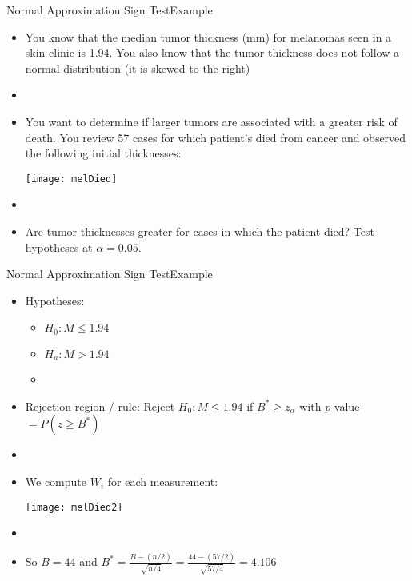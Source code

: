 \documentclass[xcolor=dvipsnames]{beamer}
\begin{document}
\begin{frame}{Normal Approximation Sign Test}{Example}
	\begin{itemize}
		\item You know that the median tumor thickness (mm) for melanomas seen in a skin clinic is 1.94. You also know that the tumor thickness does not follow a normal distribution (it is skewed to the right) \pause
		\item[]
		\item You want to determine if larger tumors are associated with a greater risk of death. You review 57 cases for which patient's died from cancer and observed the following initial thicknesses:
		\begin{center}
			\texttt{[image: melDied]}
		\end{center} \pause
	\item[]
		\item Are tumor thicknesses greater for cases in which the patient died? Test hypotheses at $\alpha = 0.05$.
	\end{itemize}
\end{frame}

\begin{frame}{Normal Approximation Sign Test}{Example}
	\begin{itemize}
		\item Hypotheses: \pause
		\begin{itemize}
			\item $H_0: M \leq 1.94$ \pause
			\item $H_a: M > 1.94$ \pause
			\item[]
		\end{itemize}
		\item Rejection region / rule: Reject $H_0: M \leq 1.94$ if $B^* \geq z_{\alpha}$ with $p$-value $=P(z \geq B^*)$ \pause
		\item[]
		\item We compute $W_i$ for each measurement: 
		\begin{center}
			\texttt{[image: melDied2]}
		\end{center} \pause
		\item[]
		\item So $B = 44$ and $B^* = \frac{B-(n/2)}{\sqrt{n/4}} = \frac{44-(57/2)}{\sqrt{57/4}} = 4.106$
	\end{itemize}
\end{frame}
\end{document}
